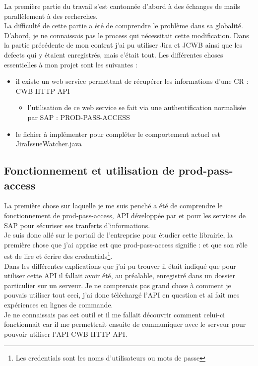 La première partie du travail s'est cantonnée d'abord à des échanges de mails parallèlement à des recherches.\\
La difficulté de cette partie a été de comprendre le problème dans sa globalité. D'abord, je ne connaissais pas le process qui nécessitait cette modification. Dans la partie précédente de mon contrat j'ai pu utiliser Jira et JCWB ainsi que les defects qui y étaient enregistrés, mais c'était tout.
Les différentes choses essentielles à mon projet sont les suivantes :

\begin{itemize}
	\item il existe un web service permettant de récupérer les informations d'une CR : CWB HTTP API
	\begin{itemize}
		\item l'utilisation de ce web service se fait via une authentification normalisée par SAP : PROD-PASS-ACCESS
	\end{itemize}
	\item le fichier à implémenter pour compléter le comportement actuel est JiraIssueWatcher.java	
\end{itemize}




\subsection{Fonctionnement et utilisation de prod-pass-access}
La première chose sur laquelle je me suis penché a été de comprendre le fonctionnement de prod-pass-access, \gls{API} développée par et pour les services de SAP pour sécuriser ses tranferts d'informations.\\
Je suis donc allé sur le portail de l'entreprise pour étudier cette librairie, la première chose que j'ai apprise est que prod-pass-access signifie :  et que son rôle est de lire et écrire des credentials\footnote{Les credentials sont les noms d'utilisateurs ou mots de passe}.\\
Dans les différentes explications que j'ai pu trouver il était indiqué que pour utiliser cette \gls{API} il fallait avoir été, au préalable, enregistré dans un dossier particulier sur un serveur. Je ne comprenais pas grand chose à comment je pouvais utiliser tout ceci, j'ai donc téléchargé l'API en question et ai fait mes expériences en lignes de commande.\\
Je ne connaissais pas cet outil et il me fallait découvrir comment celui-ci fonctionnait car il me permettrait ensuite de communiquer avec le serveur pour pouvoir utiliser l'\gls{API} CWB HTTP API.\\

